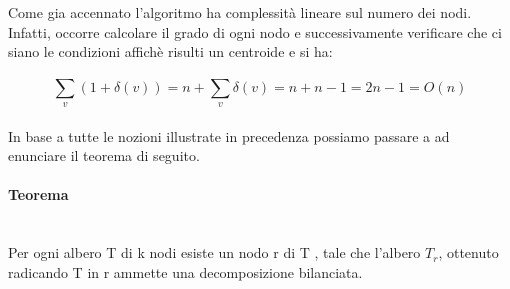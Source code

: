 Come gia accennato l’algoritmo ha complessit\`a lineare sul numero dei nodi.
Infatti, occorre calcolare il grado di ogni nodo e successivamente verificare che ci siano le condizioni affich\`e risulti un centroide e si ha:

\begin{equation*}
\sum_{v}^{}(1 + \delta(v)) = n + \sum_{v}^{} \delta(v) = n+n-1= 2n-1 =O(n)
\end{equation*}\\
In base a tutte le nozioni illustrate in precedenza possiamo passare a ad enunciare il  teorema di seguito.

\paragraph{Teorema}\mbox{}\\
Per ogni albero T di k nodi esiste un nodo r di T , tale che l’albero $T_r$, ottenuto radicando T in r ammette una decomposizione bilanciata.


